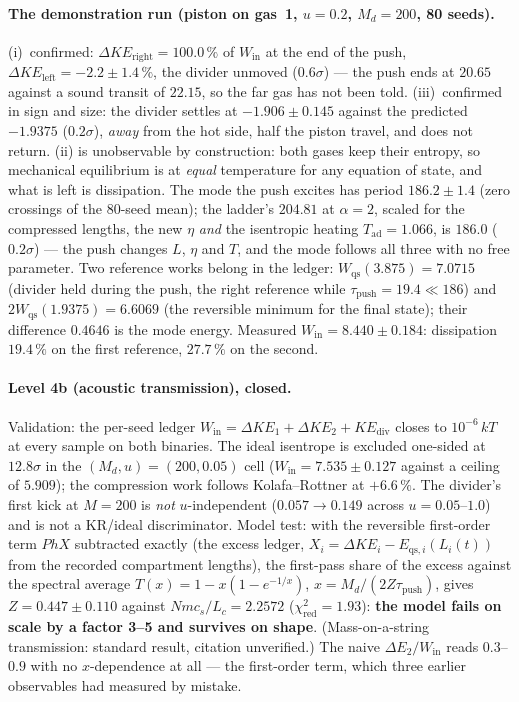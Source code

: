 \documentclass[11pt,a4paper]{article}
\begin{document}
\paragraph{The demonstration run (piston on gas~1, $u = 0.2$, $M_d = 200$, 80 seeds).}
(i)~confirmed: $\Delta KE_{\mathrm{right}} = 100.0\,\%$ of $W_{\mathrm{in}}$ at the end of the push,
$\Delta KE_{\mathrm{left}} = -2.2 \pm 1.4\,\%$, the divider unmoved ($0.6\sigma$) --- the push ends at
$20.65$ against a sound transit of $22.15$, so the far gas has not been told. (iii)~confirmed in
sign and size: the divider settles at $-1.906 \pm 0.145$ against the predicted $-1.9375$
($0.2\sigma$), \emph{away} from the hot side, half the piston travel, and does not return. (ii) is
unobservable by construction: both gases keep their entropy, so mechanical equilibrium is at
\emph{equal} temperature for any equation of state, and what is left is dissipation. The mode the
push excites has period $186.2 \pm 1.4$ (zero crossings of the 80-seed mean); the ladder's
$204.81$ at $\alpha = 2$, scaled for the compressed lengths, the new $\eta$ \emph{and} the
isentropic heating $T_{\mathrm{ad}} = 1.066$, is $186.0$ ($0.2\sigma$) --- the push changes $L$,
$\eta$ and $T$, and the mode follows all three with no free parameter. Two reference works belong
in the ledger: $W_{\mathrm{qs}}(3.875) = 7.0715$ (divider held during the push, the right reference
while $\tau_{\mathrm{push}} = 19.4 \ll 186$) and $2W_{\mathrm{qs}}(1.9375) = 6.6069$ (the reversible
minimum for the final state); their difference $0.4646$ is the mode energy. Measured
$W_{\mathrm{in}} = 8.440 \pm 0.184$: dissipation $19.4\,\%$ on the first reference, $27.7\,\%$ on the
second.

\paragraph{Level 4b (acoustic transmission), closed.} Validation: the per-seed ledger
$W_{\mathrm{in}} = \Delta KE_1 + \Delta KE_2 + KE_{\mathrm{div}}$ closes to $10^{-6}\,kT$ at every
sample on both binaries. The ideal isentrope is excluded one-sided at $12.8\sigma$ in the
$(M_d, u) = (200, 0.05)$ cell ($W_{\mathrm{in}} = 7.535 \pm 0.127$ against a ceiling of $5.909$);
the compression work follows Kolafa--Rottner at $+6.6\,\%$. The divider's first kick at $M = 200$ is
\emph{not} $u$-independent ($0.057 \to 0.149$ across $u = 0.05$--$1.0$) and is not a KR/ideal
discriminator. Model test: with the reversible first-order term $PhX$ subtracted exactly (the
excess ledger, $X_i = \Delta KE_i - E_{\mathrm{qs},i}(L_i(t))$ from the recorded compartment
lengths), the first-pass share of the excess against the spectral average
$T(x) = 1 - x(1 - e^{-1/x})$, $x = M_d/(2Z\tau_{\mathrm{push}})$, gives $Z = 0.447 \pm 0.110$
against $N m c_s/L_c = 2.2572$ ($\chi^2_{\mathrm{red}} = 1.93$): \textbf{the model fails on scale by a
factor 3--5 and survives on shape}. (Mass-on-a-string transmission: standard result, citation
unverified.) The naive $\Delta E_2/W_{\mathrm{in}}$ reads $0.3$--$0.9$ with no $x$-dependence at
all --- the first-order term, which three earlier observables had measured by mistake.
\end{document}
